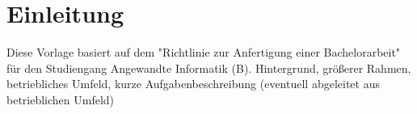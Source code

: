 \section{Einleitung}


Diese Vorlage basiert auf dem "Richtlinie zur Anfertigung einer Bachelorarbeit" für den Studiengang Angewandte Informatik (B).\newline
\newline
Hintergrund, größerer Rahmen, betriebliches Umfeld, kurze Aufgabenbeschreibung (eventuell abgeleitet aus betrieblichen Umfeld)


\pagebreak